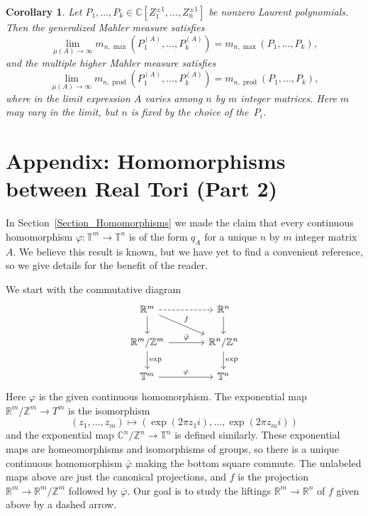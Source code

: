 \documentclass[12pt]{amsart}
\theoremstyle{plain}
\newtheorem{corollary}[theorem]{Corollary}
\theoremstyle{definition}
\theoremstyle{remark}
\numberwithin{theorem}{section}
\numberwithin{equation}{section} %
\newcommand{\CC}{\mathbb{C}}
\newcommand{\bZ}{{\mathbb{Z}}}
\newcommand{\bR}{{\mathbb{R}}}
\newcommand{\bC}{{\mathbb{C}}}
\newcommand{\torus}{{\mathbb{T}}}
\begin{document}
\begin{corollary} \label{extendedIssa2}
Let $P_1, \ldots, P_k \in\CC\left[Z_1^{\pm1},\dots, Z_n^{\pm1}\right]$ be nonzero Laurent polynomials. Then
the generalized Mahler measure satisfies
    \[\lim_{\mu\left( {A} \right)  \to \infty} m_{n, \max}\left( P_1^{(A)}, \ldots,  P_k^{(A)}\right)
    =m_{n, \max}( P_1, \ldots,  P_k),
    \]
    and the multiple higher Mahler measure satisfies
    \[
    \lim_{\mu\left( A \right)  \to \infty} m_{n, \operatorname{prod}}\left( P_1^{(A)}, \ldots,  P_k^{(A)}\right)
    =m_{n, \operatorname{prod}}(P_1, \ldots, P_k),
    \]
where in the limit expression $A$ varies among $n$ by $m$ integer matrices. Here $m$ may vary in the limit, but $n$ is fixed by the choice of the~$P_i$. %
\end{corollary}


\section*{Appendix: Homomorphisms between Real Tori (Part 2)}

In Section~\ref{Section_Homomorphisms} we made the claim that every continuous homomorphism $\varphi \colon \torus^m \to \torus^n$ is of the form $q_A$ for a unique $n$ by $m$ integer matrix $A$.
We believe this result is known, but we have yet to find a convenient reference, so we give details for the benefit of the reader. 

We start with the commutative diagram
 $$
 \begin{tikzcd} [column sep = large]
\bR^m  \arrow[r, dashed]  \arrow[d] \arrow[rd, "f"] & \bR^n \arrow[d]    \\
\bR^m/\bZ^m  \arrow[r, "\bar \varphi"]  \arrow[d, "\mathrm{exp}"] & \bR^n/\bZ^n  \arrow[d, "\mathrm{exp}"]   \\
\torus^m  \arrow[r,  "\varphi"]  & \torus^n    
\end{tikzcd}
$$
Here $\varphi$ is the given continuous homomorphism. 
The exponential map $\bR^m / \bZ^m \to T^m$ is the isomorphism 
$$
(z_1, \ldots, z_m) \mapsto \left( \exp(2 \pi z_1 i), \ldots, \exp(2 \pi z_m i) \right)
$$
and the exponential map $\bC^n / \bZ^n \to \torus^n$ is defined similarly.
These exponential maps are homeomorphisms and isomorphisms of groups, so there is a unique continuous homomorphism $\bar \varphi$ making the bottom square commute.
The unlabeled maps above are just the canonical projections, and $f$ is the projection $\bR^m \to \bR^m/\bZ^m$ followed by $\overline \varphi$.
Our goal is to study the liftings $\bR^m \to \bR^n$ of $f$ given above by a dashed arrow.
\end{document}
